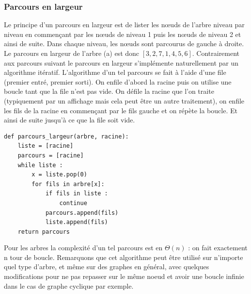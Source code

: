 \documentclass{report}
\begin{document}
\subsubsection{Parcours en largeur}
Le principe d'un parcours en largeur est de lister les nœuds de l'arbre niveau par niveau en commençant par les nœuds de niveau 1 puis les nœuds de niveau 2 et ainsi de suite. Dans chaque niveau, les nœuds sont parcourus de gauche à droite.
Le parcours en largeur de l'arbre (a) est donc $[3, 2, 7, 1, 4, 5, 6]$.
Contrairement aux parcours suivant le parcours en largeur s'implémente naturellement par un algorithme itératif.
L'algorithme d'un tel parcours se fait à l'aide d'une file (premier entré, premier sorti). On enfile d'abord la racine puis on utilise une boucle tant que la file n'est pas vide.
On défile la racine que l'on traite (typiquement par un affichage mais cela peut être un autre traitement), on enfile les fils de la racine en commençant par le fils gauche et on répète la boucle. Et ainsi de suite jusqu'à ce que la file soit vide.
\begin{lstlisting}
def parcours_largeur(arbre, racine):
	liste = [racine]
	parcours = [racine]
	while liste :
		x = liste.pop(0)
		for fils in arbre[x]:
			if fils in liste : 
				continue
			parcours.append(fils)
			liste.append(fils)
	return parcours
\end{lstlisting}
Pour les arbres la complexité d'un tel parcours est en $\Theta(n)$ : on fait exactement n tour de boucle. 
Remarquons que cet algorithme peut être utilisé sur n'importe quel type d'arbre, et même sur des graphes en général, avec quelques modifications pour ne pas repasser sur le même noeud et avoir une boucle infinie dans le cas de graphe cyclique par exemple.
\end{document}
